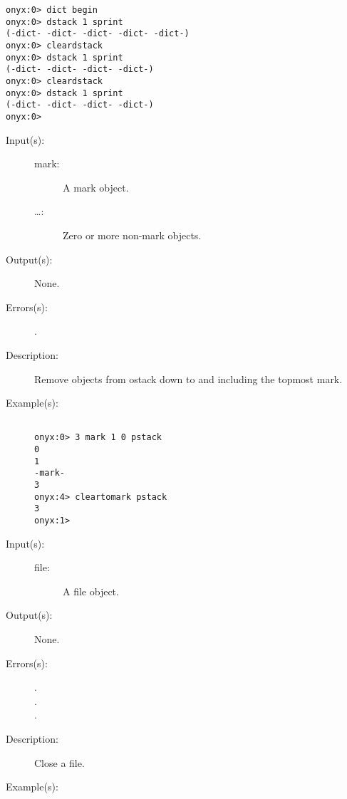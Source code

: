 \begin{description}
\begin{description}
\begin{verbatim}
onyx:0> dict begin
onyx:0> dstack 1 sprint
(-dict- -dict- -dict- -dict- -dict-)
onyx:0> cleardstack
onyx:0> dstack 1 sprint
(-dict- -dict- -dict- -dict-)
onyx:0> cleardstack
onyx:0> dstack 1 sprint
(-dict- -dict- -dict- -dict-)
onyx:0>
		\end{verbatim}
	\end{description}
\label{systemdict:cleartomark}
\item[{\onyxop{mark \dots}{cleartomark}{--}}: ]
	\begin{description}\item[]
	\item[Input(s): ]
		\begin{description}\item[]
		\item[mark: ]
			A mark object.
		\item[\dots: ]
			Zero or more non-mark objects.
		\end{description}
	\item[Output(s): ] None.
	\item[Errors(s): ]
		\begin{description}\item[]
		\item[.]
		\end{description}
	\item[Description: ]
		Remove objects from ostack down to and including the topmost
		mark.
	\item[Example(s): ]\begin{verbatim}

onyx:0> 3 mark 1 0 pstack
0
1
-mark-
3
onyx:4> cleartomark pstack
3
onyx:1>
		\end{verbatim}
	\end{description}
\label{systemdict:close}
\item[{\onyxop{file}{close}{--}}: ]
	\begin{description}\item[]
	\item[Input(s): ]
		\begin{description}\item[]
		\item[file: ]
			A file object.
		\end{description}
	\item[Output(s): ] None.
	\item[Errors(s): ]
		\begin{description}\item[]
		\item[.]
		\item[.]
		\item[.]
		\end{description}
	\item[Description: ]
		Close a file.
	\item[Example(s): ]\begin{verbatim}


\end{verbatim}
\end{description}
\end{description}
